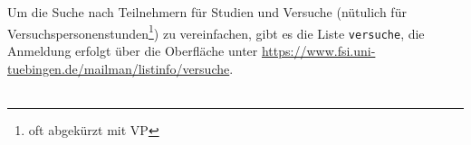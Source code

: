 Um die Suche nach Teilnehmern für Studien und Versuche (nütulich für Versuchspersonenstunden\footnote{oft abgekürzt mit VP}) zu vereinfachen, gibt es die Liste \texttt{versuche}, 
die Anmeldung erfolgt über die Oberfläche unter \url{https://www.fsi.uni-tuebingen.de/mailman/listinfo/versuche}. \\\\
\fi
